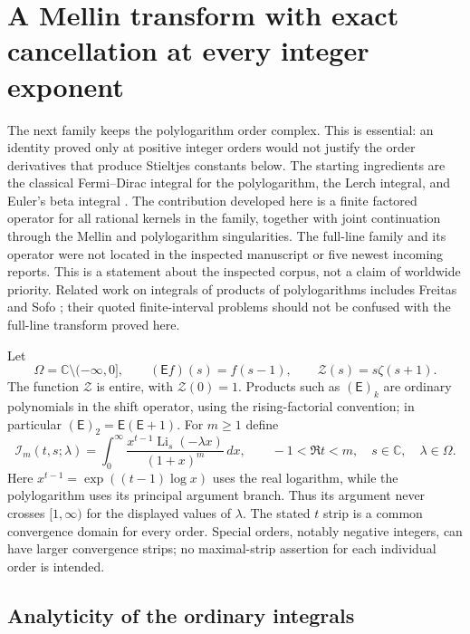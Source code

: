 \section{A Mellin transform with exact cancellation at every integer exponent}
\label{mpr:sec:main}

The next family keeps the polylogarithm order complex.  This is essential:
an identity proved only at positive integer orders would not justify the
order derivatives that produce Stieltjes constants below.  The starting
ingredients are the classical Fermi--Dirac integral for the polylogarithm,
the Lerch integral, and Euler's beta integral
\cite{DLMFPolylog,mpr:DLMFLerch,mpr:DLMFbeta}.
The contribution developed here is a finite factored operator for all
rational kernels in the family, together with joint continuation through
the Mellin and polylogarithm singularities.  The full-line family and its
operator were not located in the inspected manuscript or five newest
incoming reports.  This is a statement about the inspected corpus, not a
claim of worldwide priority.  Related work on integrals of products of
polylogarithms includes Freitas and Sofo
\cite{mpr:Freitas,mpr:Sofo}; their quoted finite-interval problems should
not be confused with the full-line transform proved here.

Let
\[
 \Omega=\mathbb C\setminus(-\infty,0],\qquad
 (\mathsf Ef)(s)=f(s-1),\qquad
 \mathscr Z(s)=s\zeta(s+1).
\]
The function $\mathscr Z$ is entire, with $\mathscr Z(0)=1$.
Products such as $(\mathsf E)_k$ are ordinary polynomials in the shift
operator, using the rising-factorial convention; in particular
$(\mathsf E)_2=\mathsf E(\mathsf E+1)$.
For $m\ge1$ define
\begin{equation}\label{mpr:eq:integral}
 \mathcal I_m(t,s;\lambda)
 =\int_0^\infty
       \frac{x^{t-1}\operatorname{Li}_s(-\lambda x)}{(1+x)^m}\,dx,
 \qquad -1<\Re t<m,\quad s\in\mathbb C,\quad\lambda\in\Omega.
\end{equation}
Here $x^{t-1}=\exp((t-1)\log x)$ uses the real logarithm, while the
polylogarithm uses its principal argument branch.  Thus its argument never
crosses $[1,\infty)$ for the displayed values of $\lambda$.
The stated $t$ strip is a common convergence domain for every order.
Special orders, notably negative integers, can have larger convergence
strips; no maximal-strip assertion for each individual order is intended.

\subsection{Analyticity of the ordinary integrals}

